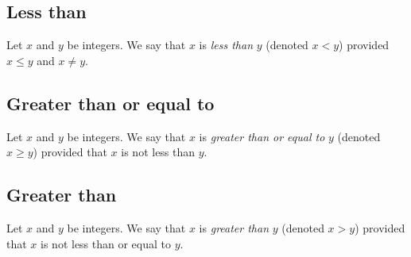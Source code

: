 \documentclass[12pt]{article}
\begin{document}
\subsection{Less than}
Let $x$ and $y$ be integers. We say that $x$ is \textit{less than} $y$ (denoted $x<y$) provided $x\leq y$ and $x\neq y$.
\subsection{Greater than or equal to}
Let $x$ and $y$ be integers. We say that $x$ is \textit{greater than or equal to} $y$ (denoted $x\geq y$) provided that $x$ is not less than $y$.
\subsection{Greater than}
Let $x$ and $y$ be integers. We say that $x$ is \textit{greater than} $y$ (denoted $x>y$) provided that $x$ is not less than or equal to $y$.
\end{document}

